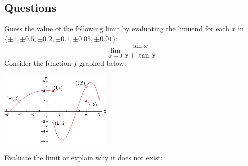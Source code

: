 \clearpage
\subsection*{Questions}
\begin{questions}
  \questioA Guess the value of the following limit by evaluating the limuend for each $ x $ in $ \{ \pm 1, \pm 0.5, \pm 0.2, \pm 0.1, \pm 0.05, \pm 0.01 \} $:
            \begin{displaymath}
              \lim_{x \to 0} \frac{\sin x}{x + \tan x}
            \end{displaymath}
  \questioA Consider the function $ f $ graphed below.
    \begin{center}
      \includegraphics[width=0.4\textwidth]{oslimit}
    \end{center}
  \questioM Evaluate the limit or explain why it does not exist:
    \begin{multicols}{2}
    \begin{parts}

\end{parts}
\end{multicols}
\end{questions}
